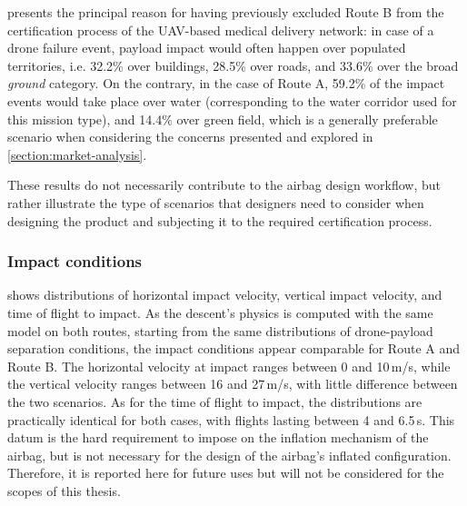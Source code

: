 presents the principal reason for having previously excluded Route B from the certification process of the UAV-based medical delivery network: in case of a drone failure event, payload impact would often happen over populated territories, i.e. 32.2\% over buildings, 28.5\% over roads, and 33.6\% over the broad \textit{ground} category. On the contrary, in the case of Route A, 59.2\% of the impact events would take place over water (corresponding to the water corridor used for this mission type), and 14.4\% over green field, which is a generally preferable scenario when considering the concerns presented and explored in \cref{section:market-analysis}. 

These results do not necessarily contribute to the airbag design workflow, but rather illustrate the type of scenarios that designers need to consider when designing the product and subjecting it to the required certification process.

\subsubsection{Impact conditions} 
 shows distributions of horizontal impact velocity, vertical impact velocity, and time of flight to impact. As the descent's physics is computed with the same model on both routes, starting from the same distributions of drone-payload separation conditions, the impact conditions appear comparable for Route A and Route B. The horizontal velocity at impact ranges between 0 and 10\,m/s, while the vertical velocity ranges between 16 and 27\,m/s, with little difference between the two scenarios. As for the time of flight to impact, the distributions are practically identical for both cases, with flights lasting between 4 and 6.5\,s. This datum is the hard requirement to impose on the inflation mechanism of the airbag, but is not necessary for the design of the airbag's inflated configuration. Therefore, it is reported here for future uses but will not be considered for the scopes of this thesis.

